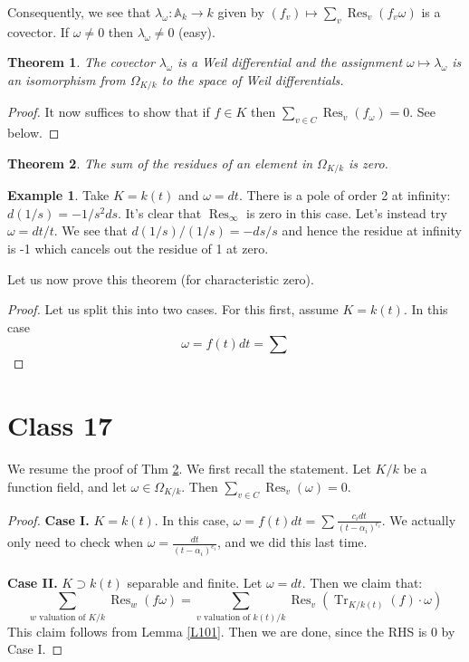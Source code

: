 \documentclass{article}
\DeclareMathOperator{\Tr}{Tr}
\DeclareMathOperator{\Res}{Res}
\DeclareMathOperator{\res}{Res}
\theoremstyle{plain}
\newtheorem{thm}{Theorem}
\theoremstyle{definition}
\newtheorem{exmp}{Example}
\theoremstyle{remark}
\begin{document}
Consequently, we see that $\lambda_\omega:\mathbb{A}_k\to k$ given by $(f_v)\mapsto \sum_v\res_v(f_v\omega)$ is a covector. If $\omega\neq 0$ then $\lambda_\omega\neq 0$ (easy).

\begin{thm}
\label{L99}
The covector $\lambda_\omega$ is a Weil differential and the assignment $\omega\mapsto\lambda_\omega$ is an isomorphism from $\Omega_{K/k}$ to the space of Weil differentials.
\end{thm}
\begin{proof}
It now suffices to show that if $f\in K$ then $\sum_{v\in C}\res_v(f_\omega)=0$. See below.
\end{proof}

\begin{thm}
\label{L100}
The sum of the residues of an element in $\Omega_{K/k}$ is zero. 
\end{thm}

\begin{exmp}
Take $K=k(t)$ and $\omega=dt$. There is a pole of order 2 at infinity: $d(1/s)=-1/s^2 ds$. It's clear that $\res_\infty$ is zero in this case.
Let's instead try $\omega=dt/t$. We see that $d(1/s)/(1/s)=-ds/s$ and hence the residue at infinity is -1 which cancels out the residue of 1 at zero.
\end{exmp}

Let us now prove this theorem (for characteristic zero).
\begin{proof}
Let us split this into two cases. For this first, assume $K=k(t)$. In this case
\[\omega=f(t)dt=\sum\]
\end{proof}


\section*{Class 17}
We resume the proof of Thm \ref{L100}. We first recall the statement. Let $K/k$ be a function field, and let $\omega \in \Omega_{K/k}$. Then $\sum_{v\in C} \Res_v(\omega) = 0$.
\begin{proof}
\textbf{Case I.} $K = k(t)$. In this case, $\omega = f(t) dt = \sum \frac{c_i dt}{(t-\alpha_i)^{e_i}}$. We actually only need to check when $\omega = \frac{dt}{(t-\alpha_i)^{e_i}}$, and we did this last time. 
\\
\\
\textbf{Case II.} $K \supset k(t)$ separable and finite. Let $\omega = dt$. Then we claim that:
\[       \sum_{w \text{ valuation of } K/k} \Res_w(f\omega) = \sum_{v \text{ valuation of } k(t)/k} \Res_v (\Tr_{K/k(t)} (f) \cdot \omega)     \]
This claim follows from Lemma \ref{L101}. Then we are done, since the RHS is 0 by Case I.
\end{proof}
\end{document}
